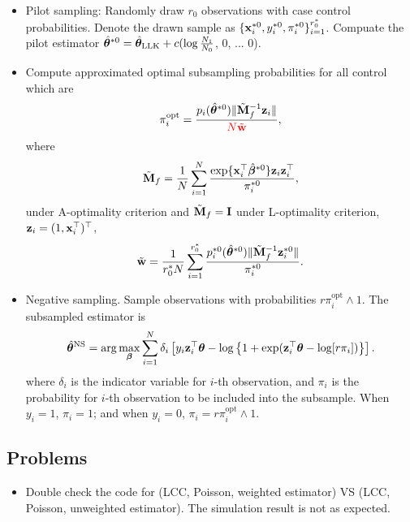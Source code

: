 \documentclass[letterpaper,12pt,hidelinks]{article}
\begin{document}
\begin{itemize}
    \item Pilot sampling: Randomly draw $r_0$ observations with case control 
    probabilities. Denote the drawn sample as 
    $\{\mathbf{x}_i^{*0}, y_i^{*0}, \pi_i^{*0}\}_{i=1}^{r_0^*}$. Compuate the pilot 
    estimator 
    ${\hat{\boldsymbol{\theta}}}^{*0} = {\hat{\boldsymbol{\theta}}}_{\mathrm{LLK}} + c(\log\frac{N_1}{N_0}$, 0, ... 0).
    \item Compute approximated optimal subsampling probabilities for all 
    control which are 
    \begin{align*}
        \pi_i^{\mathrm{opt}} = \frac{p_i({\hat{\boldsymbol{\theta}}}^{*0})\|\tilde{\mathbf{M}}_f^{-1} \mathbf{z}_i\|}{\color{red} N\tilde{\mathbf{w}}},
    \end{align*}
    where 
    \begin{align*}
        \tilde{\mathbf{M}}_f = \frac{1}{N}\sum_{i=1}^{N} \frac{\exp\{ \mathbf{x}_i^{\top} \hat{\boldsymbol{\beta}}^{*0}\} \mathbf{z}_i\mathbf{z}_i^{\top}}{\pi_i^{*0}},
    \end{align*}
    under A-optimality criterion and $\tilde{\mathbf{M}}_f = \mathbf{I}$ under L-optimality criterion, 
$\mathbf{z}_i = (1, \mathbf{x}_i^{\top})^{\top}$,  
\begin{align*}
    \tilde{\mathbf{w}} = \frac{1}{r_0^* N} \sum_{i=1}^{r_0^{*}} \frac{p^{*0}_i({\hat{\boldsymbol{\theta}}}^{*0})\|\tilde{\mathbf{M}}_f^{-1} \mathbf{z}^{*0}_i\|}{\pi_i^{*0}}.
\end{align*}
\item Negative sampling. Sample observations with probabilities 
$r \pi_i^{\mathrm{opt}} \wedge 1$. The subsampled estimator is 
\begin{align*}
    {\hat{\boldsymbol{\theta}}}^{\mathrm{NS}} = \arg\max_{\boldsymbol{\beta}} \sum_{i=1}^{N} \delta_i 
    \left[y_i \mathbf{z}_i^{\top} \boldsymbol{\theta} - \log\left\{ 1 + \exp(\mathbf{z}_i^{\top} \boldsymbol{\theta} - \log [r \pi_i]) \right\}\right].
\end{align*}
where $\delta_i$ is the indicator variable for $i$-th observation, and 
$\pi_i$ is the probability for $i$-th observation to be included into 
the subsample. When $y_i = 1$, $\pi_i = 1$; and 
when $y_i = 0$, $\pi_i = r\pi_i^{\mathrm{opt}} \wedge 1$.
\end{itemize}

\subsection{Problems}

\begin{itemize}
    \item Double check the code for (LCC, Poisson, weighted estimator) VS 
    (LCC, Poisson, unweighted estimator). The simulation result is not as expected.
\end{itemize}
\end{document}
